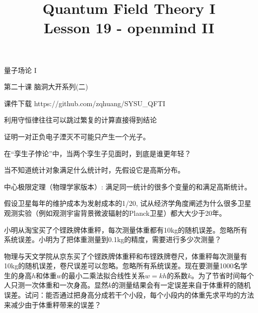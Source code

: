\documentclass[CJK]{beamer}
\title{Quantum Field Theory I \\ Lesson 19 - openmind II}
\author{}
\date{}
\begin{document}
\begin{frame}
 
\begin{center}
\begin{Large}
\bch
量子场论 I 

{\vskip 0.3in}

第二十课 脑洞大开系列(二)

\ech
\end{Large}
\end{center}

\vskip 0.2in

\bch
课件下载
\ech
https://github.com/zqhuang/SYSU\_QFTI

\end{frame}



\begin{frame}
\bch
利用守恒律往往可以跳过繁复的计算直接得到结论
\ech
\end{frame}

\begin{frame}
\bch
证明一对正负电子湮灭不可能只产生一个光子。
\ech
\end{frame}

\begin{frame}
\bch
在“孪生子悖论”中，当两个孪生子见面时，到底是谁更年轻？
\ech
\end{frame}

\begin{frame}
\bch
当不知道统计对象满足什么统计时，先假设它是高斯分布。
\ech
\end{frame}

\begin{frame}
\bch
中心极限定理（物理学家版本）: 满足同一统计的很多个变量的和满足高斯统计。
\ech
\end{frame}

\begin{frame}
\bch
假设卫星每年的维护成本为发射成本的1/20, 试从经济学角度阐述为什么很多卫星观测实验（例如观测宇宙背景微波辐射的Planck卫星）都大大少于20年。
\ech
\end{frame}

\begin{frame}
\bch
小明从淘宝买了个铿跌牌体重秤，每次测量体重都有10kg的随机误差。忽略所有系统误差。小明为了把体重测量到0.1kg的精度，需要进行多少次测量？
\ech
\end{frame}


\begin{frame}
\bch
物理与天文学院从京东买了个铿跌牌体重秤和布铿跌牌卷尺，体重秤每次测量有10kg的随机误差，卷尺误差可以忽略。忽略所有系统误差。现在要测量1000名学生的身高$h$和体重$w$的最小二乘法拟合线性关系$w = k h$的系数$k$。为了节省时间每个人只测一次体重和一次身高。显然$k$的测量结果会有一定误差来自于体重秤的随机误差。试问：能否通过把身高分成若干个小段，每个小段内的体重先求平均的方法来减少由于体重秤带来的误差？
\ech
\end{frame}
\end{document}
